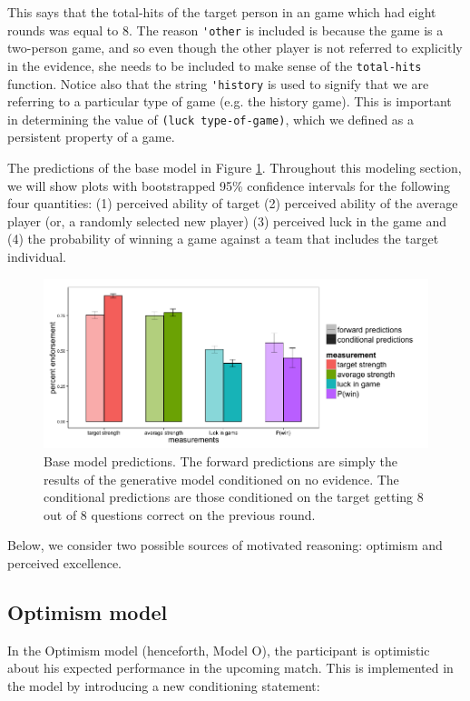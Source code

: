 \documentclass{article}
\begin{document}
This says that the total-hits of the target person in an game which had eight rounds was equal to 8. The reason \lstinline{'other} is included is because the game is a two-person game, and so even though the other player is not referred to explicitly in the evidence, she needs to be included to make sense of the \lstinline{total-hits} function. Notice also that the string \lstinline{'history} is used to signify that we are referring to a particular type of game (e.g. the history game). This is important in determining the value of \lstinline{(luck type-of-game)}, which we defined as a persistent property of a game.

The predictions of the base model in Figure \ref{fig:base}. Throughout this modeling section, we will show plots with bootstrapped 95\% confidence intervals for the following four quantities: (1) perceived ability of target (2) perceived ability of the average player (or, a randomly selected new player) (3) perceived luck in the game and (4) the probability of winning a game against a team that includes the target individual. 

\begin{figure}
\centering
    \includegraphics[width=\columnwidth]{basePredictions}
    \caption{Base model predictions. The forward predictions are simply the results of the generative model conditioned on no evidence. The conditional predictions are those conditioned on the target getting 8 out of 8 questions correct on the previous round.}
      \label{fig:base}
\end{figure}


Below, we consider two possible sources of motivated reasoning: optimism and perceived excellence. 
\subsection{Optimism model}

In the Optimism model (henceforth, Model O), the participant is optimistic about his expected performance in the upcoming match. This is implemented in the model by introducing a new conditioning statement: 
\end{document}
